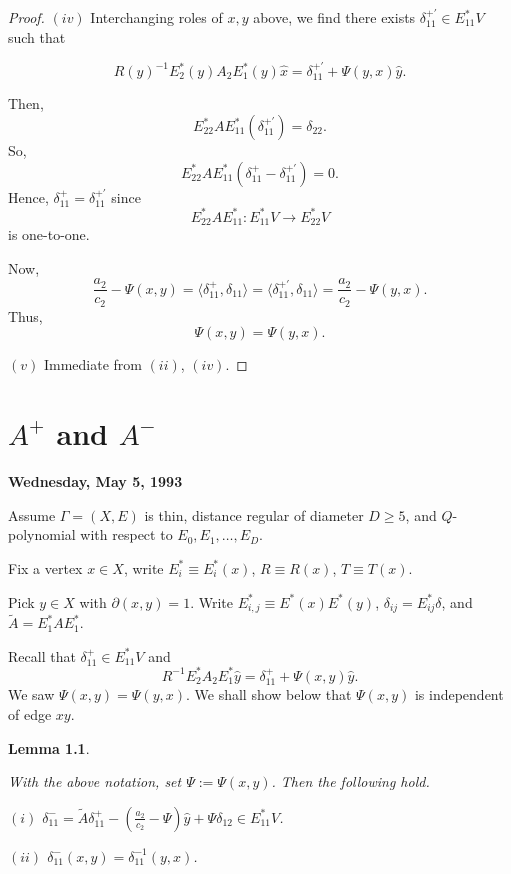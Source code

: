 \documentclass[
]{book}
\newtheorem{lemma}{Lemma}[chapter]
\theoremstyle{definition}
\theoremstyle{definition}
\theoremstyle{definition}
\theoremstyle{definition}
\theoremstyle{remark}
\begin{document}
\begin{proof}
\((iv)\) Interchanging roles of \(x, y\) above, we find there exists \(\delta^{+'}_{11}\in E^*_{11}V\) such that

\[R(y)^{-1}E^*_2(y)A_2E^*_1(y)\hat{x} = \delta^{+'}_{11} + \Psi(y,x)\hat{y}.\]

Then,
\[E^*_{22}AE^*_{11}(\delta^{+'}_{11}) = \delta_{22}.\]
So,
\[E^*_{22}AE^*_{11}(\delta^{+}_{11}-\delta^{+'}_{11}) = 0.\]
Hence, \(\delta^+_{11} = \delta^{+'}_{11}\) since
\[E^*_{22}AE^*_{11}: E^*_{11}V \to E^*_{22}V\]
is one-to-one.

Now,
\[\frac{a_2}{c_2}-\Psi(x,y) = \langle \delta^+_{11}, \delta_{11}\rangle = \langle \delta^{+'}_{11}, \delta_{11}\rangle = \frac{a_2}{c_2}-\Psi(y,x).\]
Thus,
\[\Psi(x,y) = \Psi(y,x).\]

\((v)\) Immediate from \((ii)\), \((iv)\).

\end{proof}

\hypertarget{lec39}{%
\chapter{\texorpdfstring{\(A^+\) and \(A^-\)}{A\^{}+ and A\^{}-}}\label{lec39}}

\textbf{Wednesday, May 5, 1993}

Assume \(\Gamma = (X, E)\) is thin, distance regular of diameter \(D\geq 5\), and \(Q\)-polynomial with respect to \(E_0, E_1, \ldots, E_D\).

Fix a vertex \(x\in X\), write \(E^*_i\equiv E^*_i(x)\), \(R\equiv R(x)\), \(T\equiv T(x)\).

Pick \(y\in X\) with \(\partial(x,y) = 1\). Write \(E^*_{i,j} \equiv E^*(x)E^*(y)\), \(\delta_{ij} = E^*_{ij}\delta\), and \(\tilde{A} = E^*_1AE^*_1\).

Recall that \(\delta^+_{11}\in E^*_{11}V\) and
\[R^{-1}E^*_2A_2E^*_1\hat{y} = \delta^+_{11} + \Psi(x,y)\hat{y}.\]
We saw \(\Psi(x,y) = \Psi(y,x)\). We shall show below that \(\Psi(x,y)\) is independent of edge \(xy\).

\begin{lemma}
\protect\hypertarget{lem:delta-minus11}{}\label{lem:delta-minus11}

With the above notation, set \(\Psi:=\Psi(x,y)\). Then the following hold.

\((i)\) \(\delta^-_{11} = \tilde{A}\delta^+_{11} - \left( \frac{a_2}{c_2} - \Psi\right)\hat{y} + \Psi \delta_{12}\in E^*_{11}V\).

\((ii)\) \(\delta^-_{11}(x,y) = \delta^{-1}_{11}(y,x)\).

\end{lemma}
\end{document}
